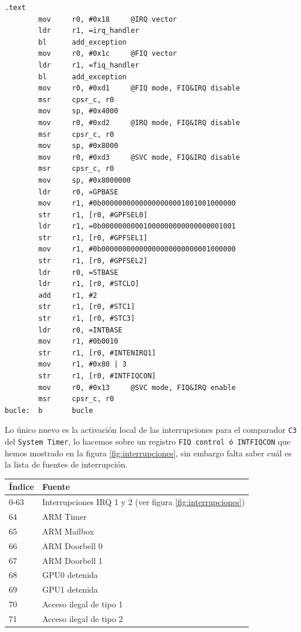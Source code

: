 \begin{lstlisting}[caption={Programa principal de inter3.c},label={lst:codigoPract5_1}]
.text
        mov     r0, #0x18     @IRQ vector
        ldr     r1, =irq_handler
        bl      add_exception
        mov     r0, #0x1c     @FIQ vector
        ldr     r1, =fiq_handler
        bl      add_exception
        mov     r0, #0xd1     @FIQ mode, FIQ&IRQ disable
        msr     cpsr_c, r0
        mov     sp, #0x4000
        mov     r0, #0xd2     @IRQ mode, FIQ&IRQ disable
        msr     cpsr_c, r0
        mov     sp, #0x8000
        mov     r0, #0xd3     @SVC mode, FIQ&IRQ disable
        msr     cpsr_c, r0
        mov     sp, #0x8000000
        ldr     r0, =GPBASE
        mov     r1, #0b00000000000000000001001001000000
        str     r1, [r0, #GPFSEL0]
        ldr     r1, =0b00000000001000000000000000001001
        str     r1, [r0, #GPFSEL1]
        mov     r1, #0b00000000000000000000000001000000
        str     r1, [r0, #GPFSEL2]
        ldr     r0, =STBASE
        ldr     r1, [r0, #STCLO]
        add     r1, #2
        str     r1, [r0, #STC1]
        str     r1, [r0, #STC3]
        ldr     r0, =INTBASE
        mov     r1, #0b0010
        str     r1, [r0, #INTENIRQ1]
        mov     r1, #0x80 | 3
        str     r1, [r0, #INTFIQCON]
        mov     r0, #0x13     @SVC mode, FIQ&IRQ enable
        msr     cpsr_c, r0
bucle:  b       bucle
\end{lstlisting}

Lo único nuevo es la activación local de las interrupciones para el comparador {\tt C3} del
{\tt System Timer}, lo hacemos sobre un registro {\tt FIQ control ó INTFIQCON} que hemos
mostrado en la figura \ref{fig:interrupciones}, sin embargo falta saber cuál es la lista
de fuentes de interrupción.

\begin{longtable}{ p{2cm} | p{6cm}}
\hline
{\bf Índice} & {\bf Fuente} \\ \hline
0-63  & Interrupciones IRQ 1 y 2 (ver figura \ref{fig:interrupciones})  \\ \hline
64    & ARM Timer  \\ \hline
65    & ARM Mailbox \\ \hline
66    & ARM Doorbell 0 \\ \hline
67    & ARM Doorbell 1 \\ \hline
68    & GPU0 detenida \\ \hline
69    & GPU1 detenida \\ \hline
70    & Acceso ilegal de tipo 1 \\ \hline
71    & Acceso ilegal de tipo 2 \\ \hline
\end{longtable}

